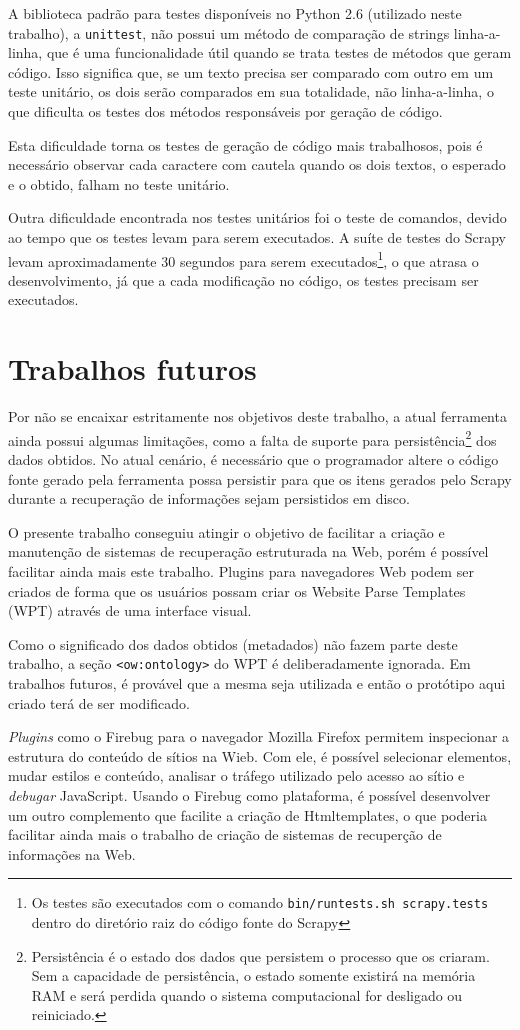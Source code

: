 A biblioteca padrão para testes disponíveis no Python 2.6 (utilizado neste trabalho), a \texttt{unittest}, não possui um método de comparação de strings linha-a-linha, que é uma funcionalidade útil quando se trata testes de métodos que geram código. Isso significa que, se um texto precisa ser comparado com outro em um teste unitário, os dois serão comparados em sua totalidade, não linha-a-linha, o que dificulta os testes dos métodos responsáveis por geração de código.

Esta dificuldade torna os testes de geração de código mais trabalhosos, pois é necessário observar cada caractere com cautela quando os dois textos, o esperado e o obtido, falham no teste unitário.

Outra dificuldade encontrada nos testes unitários foi o teste de comandos, devido ao tempo que os testes levam para serem executados. A suíte de testes do Scrapy levam aproximadamente 30 segundos para serem executados\footnote{Os testes são executados com o comando \texttt{bin/runtests.sh scrapy.tests} dentro do diretório raiz do código fonte do Scrapy }, o que atrasa o desenvolvimento, já que a cada modificação no código, os testes precisam ser executados.
\vfill

\pagebreak
\section{Trabalhos futuros}

Por não se encaixar estritamente nos objetivos deste trabalho, a atual ferramenta ainda possui algumas limitações, como a falta de suporte para persistência\footnote{Persistência é o estado dos dados que persistem o processo que os criaram. Sem a capacidade de persistência, o estado somente existirá na memória RAM e será perdida quando o sistema computacional for desligado ou reiniciado.} dos dados obtidos. No atual cenário, é necessário que o programador altere o código fonte gerado pela ferramenta possa persistir para que os itens gerados pelo Scrapy durante a recuperação de informações sejam persistidos em disco.

O presente trabalho conseguiu atingir o objetivo de facilitar a criação e manutenção de sistemas de recuperação estruturada na Web, porém é possível facilitar ainda mais este trabalho. Plugins para navegadores Web podem ser criados de forma que os usuários possam criar os Website Parse Templates (WPT) através de uma interface visual.

Como o significado dos dados obtidos (metadados) não fazem parte deste trabalho, a seção \texttt{<ow:ontology>} do WPT é deliberadamente ignorada. Em trabalhos futuros, é provável que a mesma seja utilizada e então o protótipo aqui criado terá de ser modificado. 

\emph{Plugins} como o Firebug \cite{firebug} para o navegador Mozilla Firefox permitem inspecionar a estrutura do conteúdo de sítios na Wieb. Com ele, é possível selecionar elementos, mudar estilos e conteúdo, analisar o tráfego utilizado pelo acesso ao sítio e \emph{debugar} JavaScript. Usando o Firebug como plataforma, é possível desenvolver um outro complemento que facilite a criação de Htmltemplates, o que poderia facilitar ainda mais o trabalho de criação de sistemas de recuperção de informações na Web.

